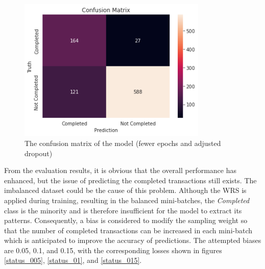 \documentclass[12pt,twoside]{report}
\begin{document}
\begin{figure}[!htbp]
	\centering
	\includegraphics[width=9cm]{cm_fewer}
	\caption{The confusion matrix of the model (fewer epochs and adjusted dropout)}
	\label{status_fewer_prediction}
\end{figure}

From the evaluation results, it is obvious that the overall performance has enhanced, but the issue of predicting the completed transactions still exists. The imbalanced dataset could be the cause of this problem. Although the WRS is applied during training, resulting in the balanced mini-batches, the \textit{Completed} class is the minority and is therefore insufficient for the model to extract its patterns. Consequently, a bias is considered to modify the sampling weight so that the number of completed transactions can be increased in each mini-batch which is anticipated to improve the accuracy of predictions. The attempted biases are 0.05, 0.1, and 0.15, with the corresponding losses shown in figures \ref{status_005}, \ref{status_01}, and \ref{status_015}. 
\\
\end{document}
